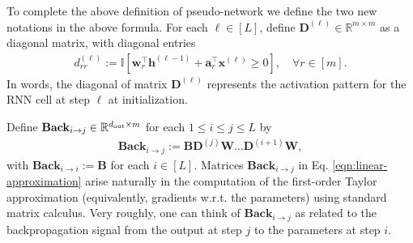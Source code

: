  To complete the above definition of pseudo-network we define the two new notations in the above formula. For each $\ell \in [L]$, define $\mathbf{D}^{(\ell)} \in \mathbb{R}^{m \times m}$ as a diagonal matrix, with diagonal entries %
\begin{align}\label{eqn:diagonal_main}
	d_{rr}^{(\ell)} := \mathbb{I}[\mathbf{w}_r^{\top} \mathbf{h}^{(\ell - 1)} + \mathbf{a}_r^{\top} \mathbf{x}^{(\ell)} \ge 0], \quad \forall r \in [m]. 
\end{align}
In words, the diagonal of matrix $\mathbf{D}^{(\ell)}$ represents the activation pattern for the RNN cell at step $\ell$ at initialization.

Define $\mathbf{Back}_{i \to j} \in \mathbb{R}^{d_{\mathrm{out}}  \times m}$ for each $1 \le i \le j \le L$ by
\begin{align*}
	\mathbf{Back}_{i \to j} := \mathbf{B} \mathbf{D}^{(j)} \mathbf{W} \ldots \mathbf{D}^{(i+1)} \mathbf{W}, 
\end{align*}
with $\mathbf{Back}_{i \to i} := \mathbf{B}$ for each $i \in [L]$. Matrices $\mathbf{Back}_{i \to j}$ in Eq. \eqref{eqn:linear-approximation} arise naturally in the 
computation of the first-order Taylor approximation (equivalently, gradients w.r.t. the parameters) using standard matrix calculus.%
Very roughly, one can think of $\mathbf{Back}_{i \to j}$ as related to the backpropagation signal from the output at step $j$ to the parameters at step $i$. 




